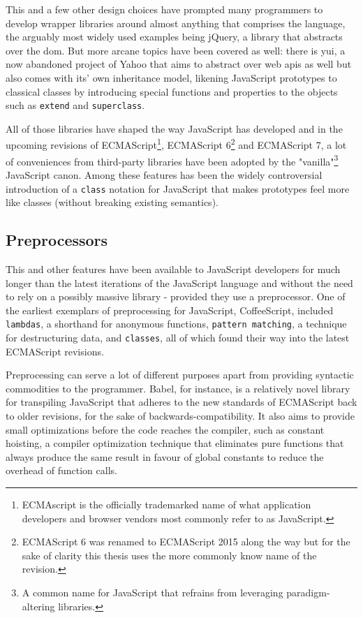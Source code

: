 \documentclass[oneside,11pt,xetex]{scrbook}
\begin{document}
This and a few other design choices have prompted many programmers to develop
wrapper libraries around almost anything that comprises the language, the arguably
most widely used examples being jQuery, a library that abstracts over the \gls{dom}.
But more arcane topics have been covered as well: there is \gls{yui}, a now abandoned
project of Yahoo that aims to abstract over web \gls{api}s as well but also comes with
its' own inheritance model, likening JavaScript prototypes to classical classes by
introducing special functions and properties to the objects such as \texttt{extend}
and \texttt{superclass}.

All of those libraries have shaped the way JavaScript has developed and in the
upcoming revisions of ECMAScript\footnote{ECMAscript is the officially trademarked
name of what application developers and browser vendors most commonly refer to as
JavaScript.}, ECMAScript 6\footnote{ECMAScript 6 was renamed to ECMAScript 2015
along the way but for the sake of clarity this thesis uses the more commonly
know name of the revision.} and ECMAScript 7, a lot of conveniences from third-party
libraries have been adopted by the "vanilla"\footnote{A common name for JavaScript
that refrains from leveraging paradigm-altering libraries.} JavaScript canon.
Among these features has been the widely controversial introduction of a \texttt{class}
notation for JavaScript that makes prototypes feel more like classes (without
breaking existing semantics).

\subsection{Preprocessors}

This and other features have been available to JavaScript developers for much
longer than the latest iterations of the JavaScript language and without
the need to rely on a possibly massive library - provided they use a preprocessor.
One of the earliest exemplars of preprocessing for JavaScript, CoffeeScript, included
\texttt{lambdas}, a shorthand for anonymous functions, \texttt{pattern matching},
a technique for destructuring data, and \texttt{classes}, all of which found
their way into the latest ECMAScript revisions.

Preprocessing can serve a lot of different purposes apart from providing
syntactic commodities to the programmer. Babel, for instance, is a relatively
novel library for transpiling JavaScript that adheres to the new standards
of ECMAScript back to older revisions, for the sake of backwards-compatibility.
It also aims to provide small optimizations before the code reaches the compiler,
such as constant hoisting, a compiler optimization technique that eliminates
pure functions that always produce the same result in favour of global constants
to reduce the overhead of function calls.
\end{document}
